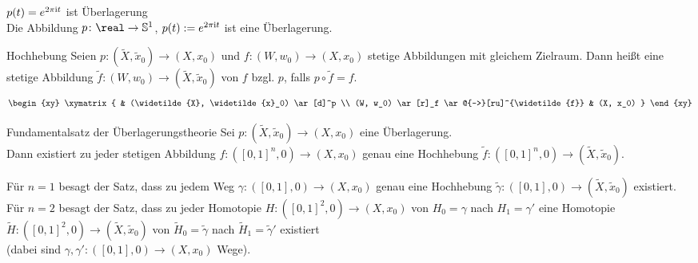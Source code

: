 \begin{Satz}{$p(t) = e^{2\pi\mathrm{i} t}$ ist Überlagerung}\\
    Die Abbildung $p\colon \real \rightarrow \sphere^1$, $p(t) := e^{2\pi\mathrm{i} t}$
    ist eine Überlagerung.
\end{Satz}

\linie
\pagebreak

\begin{Def}{Hochhebung}
    Seien $p\colon (\widetilde{X}, \widetilde{x}_0) \rightarrow (X, x_0)$
    und $f\colon (W, w_0) \rightarrow (X, x_0)$ stetige Abbildungen mit
    gleichem Zielraum.
    Dann heißt eine stetige Abbildung
    $\widetilde{f}\colon (W, w_0) \rightarrow (\widetilde{X}, \widetilde{x}_0)$
     von $f$ bzgl. $p$, falls $p \circ \widetilde{f} = f$.
    \begin{align*}
        \begin{xy}
            \xymatrix{
                &
                (\widetilde{X}, \widetilde{x}_0) \ar[d]^p \\
                (W, w_0) \ar[r]_f \ar@{-->}[ru]^{\widetilde{f}} &
                (X, x_0)
            }
        \end{xy}
    \end{align*}
\end{Def}

\begin{Satz}{Fundamentalsatz der Überlagerungstheorie}
    Sei $p\colon (\widetilde{X}, \widetilde{x}_0) \rightarrow (X, x_0)$
    eine Überlagerung. \\
    Dann existiert zu jeder stetigen Abbildung
    $f\colon ([0, 1]^n, 0) \rightarrow (X, x_0)$
    genau eine Hochhebung $\widetilde{f}\colon ([0, 1]^n, 0)
    \rightarrow (\widetilde{X}, \widetilde{x}_0)$.
\end{Satz}

\begin{Bem}
    Für $n = 1$ besagt der Satz, dass zu jedem Weg
    $\gamma\colon ([0, 1], 0) \rightarrow (X, x_0)$ genau eine Hochhebung
    $\widetilde{\gamma}\colon ([0, 1], 0) \rightarrow
    (\widetilde{X}, \widetilde{x}_0)$ existiert. \\
    Für $n = 2$ besagt der Satz, dass zu jeder Homotopie
    $H\colon ([0, 1]^2, 0) \rightarrow (X, x_0)$ von
    $H_0 = \gamma$ nach $H_1 = \gamma'$ eine Homotopie
    $\widetilde{H}\colon ([0, 1]^2, 0) \rightarrow
    (\widetilde{X}, \widetilde{x}_0)$ von
    $\widetilde{H}_0 = \widetilde{\gamma}$ nach
    $\widetilde{H}_1 = \widetilde{\gamma}'$ existiert \\
    (dabei sind $\gamma, \gamma'\colon ([0, 1], 0) \rightarrow (X, x_0)$ Wege).
\end{Bem}

